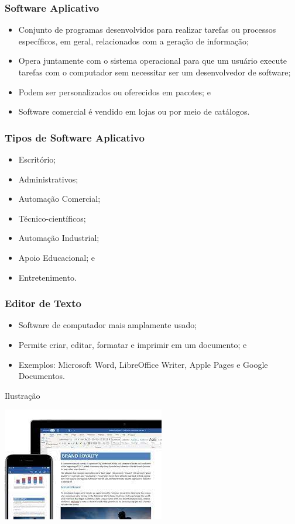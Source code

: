 \documentclass[aspectratio=169]{beamer} %
\begin{document}
\begin{frame}
	\frametitle{Software Aplicativo}
		
	\begin{itemize}
		\item Conjunto de programas desenvolvidos para realizar tarefas ou processos específicos, em geral, relacionados com a geração de informação;
		\item Opera juntamente com o sistema operacional para que um usuário execute tarefas com o computador sem necessitar ser um desenvolvedor de software;	
		\item Podem ser personalizados ou oferecidos em pacotes; e
		\item Software comercial é vendido em lojas ou por meio de catálogos.
	\end{itemize}
\end{frame}

\begin{frame}
	\frametitle{Tipos de Software Aplicativo}
		
	\begin{itemize}
		\item Escritório; 
		\item Administrativos; 
		\item Automação Comercial; 
		\item Técnico-científicos; 
		\item Automação Industrial; 
		\item Apoio Educacional;  e 
		\item Entretenimento.
	\end{itemize}
\end{frame}

\begin{frame}
	\frametitle{Editor de Texto}
		
	\begin{itemize}
		\item Software de computador mais amplamente usado;
		\item Permite criar, editar, formatar e imprimir em um documento; e 
		\item Exemplos: Microsoft Word, LibreOffice Writer, Apple Pages e Google Documentos.
	\end{itemize}\vfill
	
	\begin{exampleblock}{Ilustra\c cão}
		\begin{center}
			\includegraphics[scale=0.4]{img/word}
		\end{center}	
	\end{exampleblock}
\end{frame}
\end{document}
